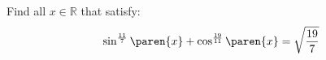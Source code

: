 Find all $x \in \mathbb{R}$ that satisfy:
\begin{equation*}
  \sin^{\frac{11}{7}}\paren{x} + \cos^{\frac{19}{11}}\paren{x} = \sqrt{\frac{19}{7}}
\end{equation*}
